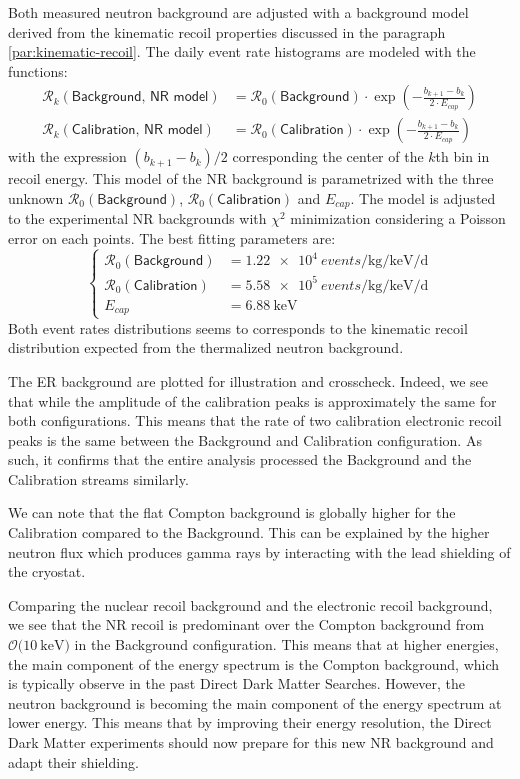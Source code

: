 Both measured neutron background are adjusted with a background model derived from the kinematic recoil properties discussed in the paragraph \ref{par:kinematic-recoil}. The daily event rate histograms are modeled with the functions:
\begin{align}
\mathcal{R}_k(\textsf{Background, NR model}) &= \mathcal{R}_0(\textsf{Background}) \cdot \exp
 \left( - \frac{ b_{k+1} - b_{k}}{2 \cdot E_{cap}} \right)
 \\
\mathcal{R}_k(\textsf{Calibration, NR model}) &= \mathcal{R}_0(\textsf{Calibration}) \cdot \exp 
 \left( - \frac{ b_{k+1} - b_{k}}{2 \cdot E_{cap}} \right)
\end{align}
with the expression $(b_{k+1} - b_{k})/2$ corresponding the center of the $k$th bin in recoil energy. This model of the NR background is parametrized with the three unknown $\mathcal{R}_0(\textsf{Background})$, $\mathcal{R}_0(\textsf{Calibration})$ and $E_{cap}$. The model is adjusted to the experimental NR backgrounds with $\chi^2$ minimization considering a Poisson error on each points. The best fitting parameters are:
\begin{equation}
\begin{cases}
\mathcal{R}_0(\textsf{Background}) &= \SI{1.22e4}{events \per \kg \per \kilo\eV \per \day}
\\
\mathcal{R}_0(\textsf{Calibration}) &= \SI{5.58e5}{events \per \kg \per \kilo\eV \per \day}
\\
E_{cap} &= \SI{6.88}{\kilo\eV}
\end{cases}
\end{equation} 
Both event rates distributions seems to corresponds to the kinematic recoil distribution expected from the thermalized neutron background.


The ER background are plotted for illustration and crosscheck. Indeed, we see that while the amplitude of the calibration peaks is approximately the same for both configurations. This means that the rate of two calibration electronic recoil peaks is the same between the Background and Calibration configuration. As such, it confirms that the entire analysis processed the Background and the Calibration streams similarly. 

We can note that the flat Compton background is globally higher for the Calibration compared to the Background. This can be explained by the higher neutron flux which produces gamma rays by interacting with the lead shielding of the cryostat.

Comparing the nuclear recoil background and the electronic recoil background, we see that the NR recoil is predominant over the Compton background from $\mathcal{O}(\SI{10}{\kilo\eV)}$ in the Background configuration. This means that at higher energies, the main component of the energy spectrum is the Compton background, which is typically observe in the past Direct Dark Matter Searches. However, the neutron background is becoming the main component of the energy spectrum at lower energy. This means that by improving their energy resolution, the Direct Dark Matter experiments should now prepare for this new NR background and adapt their shielding. 


